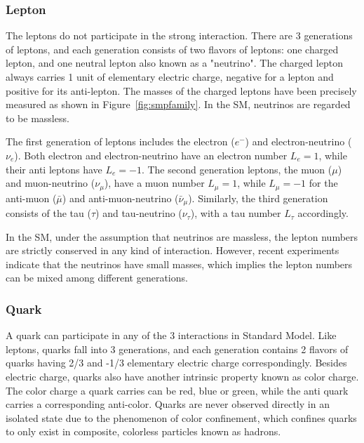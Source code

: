 \subsubsection{Lepton}
The leptons do not participate in the strong interaction. There are 3 generations of leptons, and each generation consists of two flavors of leptons: one charged lepton, and one neutral lepton also known as a "neutrino". The charged lepton always carries 1 unit of elementary electric charge, negative for a lepton and positive for its anti-lepton. The masses of the charged leptons have been precisely measured as shown in Figure~\ref{fig:smpfamily}. In the SM, neutrinos are regarded to be massless.

\vspace{0.3cm}
The first generation of leptons includes the electron ($e^{-}$) and electron-neutrino ($\nu _{e}$). Both electron and electron-neutrino have an electron number $L_{e}=1$, while their anti leptons have $L_{e}=-1$. The second generation leptons, the muon ($\mu$) and muon-neutrino ($\nu_{\mu}$), have a muon number $L_{\mu}=1$, while $L_{\mu }=-1$ for the anti-muon ($\bar{\mu}$) and anti-muon-neutrino ($\bar{\nu} _{\mu }$). Similarly, the third generation consists of the tau ($\tau$) and tau-neutrino ($\nu _{\tau }$), with a tau number $L_{\tau}$ accordingly.

\vspace{0.3cm}
In the SM, under the assumption that neutrinos are massless, the lepton numbers are strictly conserved in any kind of interaction. However, recent experiments~\cite{neutrinoOscillation1,neutrinoOscillation2} indicate that the neutrinos have small masses, which implies the lepton numbers can be mixed among different generations.
\subsubsection{Quark}
A quark can participate in any of the 3 interactions in Standard Model. Like leptons, quarks fall into 3 generations, and each generation contains 2 flavors of quarks having 2/3 and -1/3 elementary electric charge correspondingly. Besides electric charge, quarks also have another intrinsic property known as color charge. The color charge a quark carries can be red, blue or green, while the anti quark carries a corresponding anti-color. Quarks are never observed directly in an isolated state due to the phenomenon of color confinement, which confines quarks to only exist in composite, colorless particles known as hadrons.

